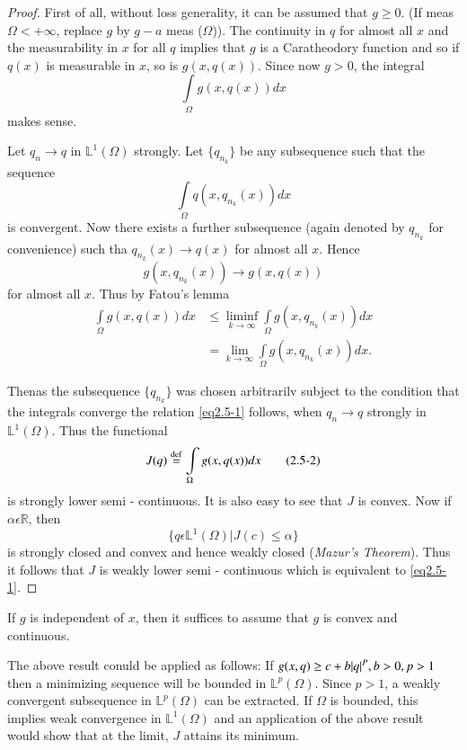 \begin{proof}
  First of all, without loss generality, it can be assumed that $g \ge
  0$. (If meas $\Omega < + \infty$, replace $g$ by $g-a$ meas
  ($\Omega$)). The continuity in $q$ for almost all $x$ and the
  measurability in $x$ for all $q$ implies that $g$ is a Caratheodory
  function and so if $q(x)$ is measurable in $x$, so is
  $g(x,q(x))$. Since now $g > 0$, the integral 
  $$
  \int \limits_{\Omega} g(x,q(x)) dx
  $$
  makes sense.

Let $q_n \rightarrow q$ in $\mathbb{L}^1(\Omega)$ strongly. Let
$\{q_{n_k} \}$ be any subsequence such that the sequence 
$$
 \int \limits_{\Omega} q(x, q_{n_k}(x)) dx
$$
is convergent. Now there exists a further subsequence (again denoted
by $q_{n_k}$ for convenience) such tha $q_{n_k}(x) \rightarrow q(x)$
for almost all $x$. Hence  
$$
 g(x, q_{n_k} (x)) \rightarrow g(x, q(x))
$$
for almost all $x$. Thus by Fatou's lemma
\begin{align*}
\int \limits_{\Omega} g(x, q(x))dx & \le \liminf_{k \rightarrow
    \infty} \int \limits_{\Omega} g(x, q_{n_k} (x)) dx \\ 
  & = \lim_{k \rightarrow \infty} \int \limits_{\Omega} g(x, q_{n_k}
  (x)) dx . 
\end{align*}

Then\pageoriginale as the subsequence $\{q_{n_k}\}$ was chosen
arbitrarilv subject 
to the condition that the integrals converge the relation \eqref{eq2.5-1}
follows, when $q_n \rightarrow q$ strongly in
$\mathbb{L}^1(\Omega)$. Thus the functional 
\begin{equation*}
 J(q) \overset{\operatorname{def}}{=} \int \limits_{\Omega} g(x, q(x))
 dx \tag{2.5-2}\label{eq2.5-2} 
\end{equation*}
is strongly lower semi - continuous. It is also easy to see that $J$
is convex. Now if $\alpha \epsilon \mathbb{R}$, then 
$$ 
\{q \epsilon \mathbb{L}^1 (\Omega)| J (c) \le \alpha \}
$$
is strongly closed and convex and hence weakly closed ({\em Mazur's
Theorem}). Thus it follows that $J$ is weakly lower semi - continuous
which is equivalent to \eqref{eq2.5-1}. 
\end{proof}

\begin{remark}\label{chap2-rem2.5.1}%
If $g$ is independent of $x$, then it suffices to assume that $g$ is
convex and continuous. 
\end{remark}

\begin{remark}\label{chap2-rem2.5.2}%
The above result conuld be applied as follows: If $g(x,q)\break \ge c +
b|q|^P, b > 0, p > 1$ then a minimizing sequence will be bounded in
$\mathbb{L}^p(\Omega)$. Since $p > 1$, a weakly convergent subsequence
in $\mathbb{L}^p(\Omega)$ can be extracted. If $\Omega$ is bounded,
this implies weak convergence in $\mathbb{L}^1(\Omega)$ and an
application of the above result would show that at the limit, $J$
attains its minimum. 
\end{remark}

